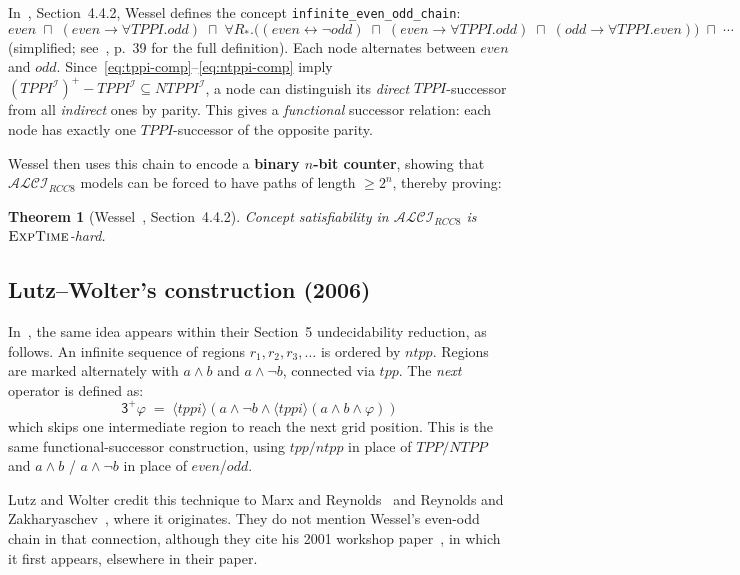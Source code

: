 \documentclass[11pt]{article}
\newtheorem{theorem}{Theorem}
\newcommand{\ALCIRCC}[1]{\ensuremath{\mathcal{ALCI}_{\mathit{RCC#1}}}}
\newcommand{\EXPTIME}{\textsc{ExpTime}}
\begin{document}
In~\cite{Wessel2003}, Section~4.4.2, Wessel defines the concept
\texttt{infinite\_even\_odd\_chain}:
\[
  \mathit{even} \;\sqcap\; (\mathit{even} \to \forall TPPI.\mathit{odd})
  \;\sqcap\; \forall R_*.\bigl((\mathit{even} \leftrightarrow \neg\mathit{odd})
  \;\sqcap\; (\mathit{even} \to \forall TPPI.\mathit{odd})
  \;\sqcap\; (\mathit{odd} \to \forall TPPI.\mathit{even})\bigr)
  \;\sqcap\; \cdots
\]
(simplified; see~\cite{Wessel2003}, p.~39 for the full definition).
Each node alternates between $\mathit{even}$ and $\mathit{odd}$.
Since~\eqref{eq:tppi-comp}--\eqref{eq:ntppi-comp} imply
$(TPPI^{\mathcal{I}})^+ - TPPI^{\mathcal{I}} \subseteq NTPPI^{\mathcal{I}}$,
a node can distinguish its \emph{direct} $TPPI$-successor from all
\emph{indirect} ones by parity.  This gives a \emph{functional} successor
relation: each node has exactly one $TPPI$-successor of the opposite parity.

Wessel then uses this chain to encode a \textbf{binary $n$-bit counter},
showing that $\ALCIRCC{8}$ models can be forced to have paths of length
$\geq 2^n$, thereby proving:

\begin{theorem}[Wessel~\cite{Wessel2003}, Section~4.4.2]
  Concept satisfiability in $\ALCIRCC{8}$ is $\EXPTIME$-hard.
\end{theorem}

\subsection{Lutz--Wolter's construction (2006)}

In~\cite{LutzWolter2006}, the same idea appears within their Section~5
undecidability reduction, as follows.  An infinite
sequence of regions $r_1, r_2, r_3, \ldots$ is ordered by $\mathit{ntpp}$.
Regions are marked alternately with $a \wedge b$ and $a \wedge \neg b$,
connected via $\mathit{tpp}$.  The \emph{next} operator is defined as:
\[
  \mathsf{3}^+ \varphi \;=\; \langle tppi\rangle(a \wedge \neg b \wedge
  \langle tppi\rangle(a \wedge b \wedge \varphi))
\]
which skips one intermediate region to reach the next grid position.  This is
the same functional-successor construction, using $tpp/ntpp$ in place of
$TPP/NTPP$ and $a \wedge b$ / $a \wedge \neg b$ in place of
$\mathit{even}$/$\mathit{odd}$.

Lutz and Wolter credit this technique to Marx and Reynolds~\cite{MarxReynolds1999}
and Reynolds and Zakharyaschev~\cite{ReynoldsZakharyaschev2001}, where it
originates.  They do not mention Wessel's even-odd chain in that connection,
although they cite his 2001 workshop paper~\cite{Wessel2001}, in which it first
appears, elsewhere in their paper.
\end{document}
